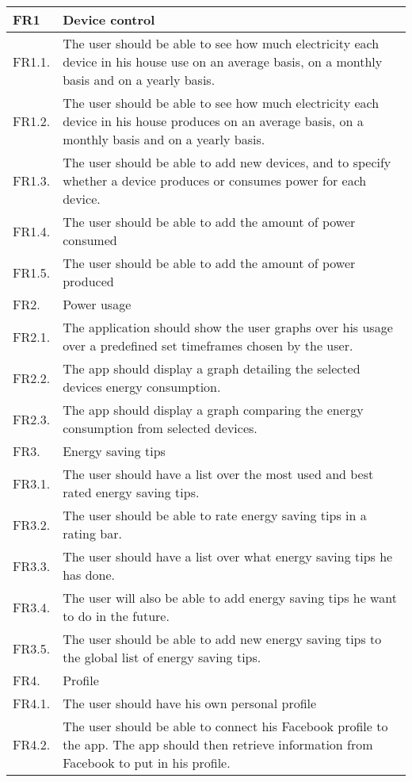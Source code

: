 \begin{longtable}{|l|p{14.5cm}|}
\hline
\cellcolor{lightgray}FR1 & \cellcolor{lightgray}Device control\\\hline
FR1.1. &The user should be able to see how much electricity each device in his house use on an average basis, on a monthly basis and on a yearly basis.\\\hline
FR1.2. &The user should be able to see how much electricity each device in his house produces on an average basis, on a monthly basis and on a yearly basis.\\\hline
FR1.3. &The user should be able to add new devices, and to specify whether a device produces or consumes power for each device.\\\hline
 FR1.4. &The user should be able to add the amount of power consumed\\\hline
FR1.5.& The user should be able to add the amount of power produced\\\hline
\cellcolor{lightgray}FR2. &\cellcolor{lightgray}Power usage\\\hline
FR2.1.& The application should show the user graphs over his usage over a predefined set timeframes chosen by the user.\\\hline
FR2.2.& The app should display a graph detailing the selected devices energy consumption.\\\hline
FR2.3.& The app should display a graph comparing the energy consumption from selected devices.\\\hline
\cellcolor{lightgray}FR3. &\cellcolor{lightgray}Energy saving tips\\\hline
FR3.1. &The user should have a list over the most used and best rated energy saving tips.\\\hline
FR3.2. &The user should be able to rate energy saving tips in a rating bar.\\\hline
FR3.3. &The user should have a list over what energy saving tips he has done.\\\hline
FR3.4.& The user will also be able to add energy saving tips he want to do in the future.\\\hline
FR3.5.& The user should be able to add new energy saving tips to the global list of energy saving tips.\\\hline
\cellcolor{lightgray}FR4.& \cellcolor{lightgray}Profile\\\hline
FR4.1.& The user should have his own personal profile\\\hline
FR4.2.& The user should be able to connect his Facebook profile to the app. The app should then retrieve information from Facebook to put in his profile.\\\hline

\end{longtable}
